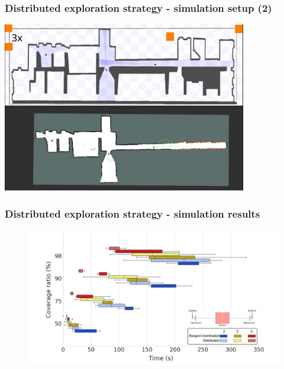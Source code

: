 \begin{frame}
	\frametitle{Distributed exploration strategy - simulation setup (2)}
		\centering
		\href{presentation_video.mp4}{\includegraphics[width=0.8\textwidth]{figures/title_screen.png}}
\end{frame}

\begin{frame}
	\frametitle{Distributed exploration strategy - simulation results}
	\begin{figure}
		\centering
		\includegraphics[width=1\textwidth]{figures/results_final}
	\end{figure}
\end{frame}


